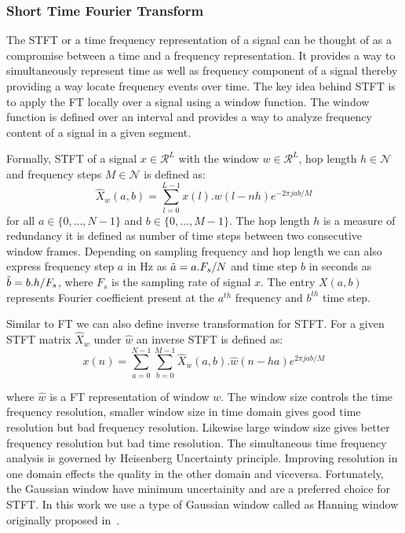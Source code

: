 \subsubsection{Short Time Fourier Transform}
The STFT or a time frequency representation of a signal can be thought of as a compromise between a time and a frequency representation. It provides a way to simultaneously represent time as well as frequency component of a signal thereby providing a way locate frequency events over time. The key idea behind STFT is to apply the FT locally over a signal using a window function. The window function is defined over an interval and provides a way to analyze frequency content of a signal in a given segment.

Formally, STFT of a signal $x\in\mathcal{R}^L$ with the window $w\in\mathcal{R}^L$, hop length $h\in\mathcal{N}$ and frequency steps $M\in\mathcal{N}$  is defined as:
\begin{equation}
    \hat{X}_w(a,b) = \sum_{l=0}^{L-1} x(l).w(l-nh)e^{-2\pi jab/M}
\end{equation}
for all $a\in\{0,...,N-1\}$ and $b\in\{0,...,M-1\}$. The hop length $h$ is a measure of redundancy it is defined as number of time steps between two consecutive window frames. Depending on sampling frequency and hop length we can also express frequency step $a$ in Hz as $\Tilde{a} = a.F_s/N$ and time step $b$ in seconds as $\Tilde{b}=b.h/F_s$, where $F_s$ is the sampling rate of signal $x$. The entry $X(a,b)$ represents Fourier coefficient present at the $a^{th}$ frequency and $b^{th}$ time step. 

Similar to FT we can also define inverse transformation for STFT. For a given STFT matrix $\hat{X}_w$ under $\hat{w}$ an inverse STFT is defined as:
\begin{equation}
    x(n) = \sum_{a=0}^{N-1} \sum_{b=0}^{M-1} \hat{X}_w(a,b).\hat{w}(n-ha)e^{2\pi jab/M}
\end{equation}

where $\hat{w}$ is a FT representation of window $w$. The window size controls the time frequency resolution, smaller window size in time domain gives good time resolution but bad frequency resolution. Likewise large window size gives better frequency resolution but bad time resolution. The simultaneous time frequency analysis is governed by Heisenberg Uncertainty principle. Improving resolution in one domain effects the quality in the other domain and viceversa. Fortunately, the Gaussian window have minimum uncertainity and are a preferred choice for STFT. In this work we use a type of Gaussian window called as Hanning window originally proposed in~\cite{harris1978use}. 

